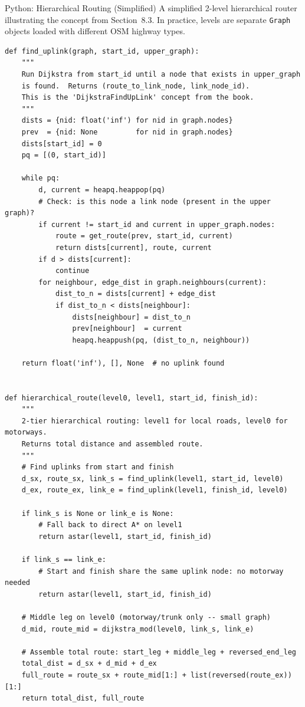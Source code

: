 \documentclass[aspectratio=169,10pt]{beamer}
\begin{document}
\begin{frame}[fragile]{Python: Hierarchical Routing (Simplified)}
  A simplified 2-level hierarchical router illustrating the concept
  from Section~8.3.  In practice, levels are separate \texttt{Graph}
  objects loaded with different OSM highway types.

\begin{lstlisting}[style=pythoncode]
def find_uplink(graph, start_id, upper_graph):
    """
    Run Dijkstra from start_id until a node that exists in upper_graph
    is found.  Returns (route_to_link_node, link_node_id).
    This is the 'DijkstraFindUpLink' concept from the book.
    """
    dists = {nid: float('inf') for nid in graph.nodes}
    prev  = {nid: None         for nid in graph.nodes}
    dists[start_id] = 0
    pq = [(0, start_id)]

    while pq:
        d, current = heapq.heappop(pq)
        # Check: is this node a link node (present in the upper graph)?
        if current != start_id and current in upper_graph.nodes:
            route = get_route(prev, start_id, current)
            return dists[current], route, current
        if d > dists[current]:
            continue
        for neighbour, edge_dist in graph.neighbours(current):
            dist_to_n = dists[current] + edge_dist
            if dist_to_n < dists[neighbour]:
                dists[neighbour] = dist_to_n
                prev[neighbour]  = current
                heapq.heappush(pq, (dist_to_n, neighbour))

    return float('inf'), [], None  # no uplink found


def hierarchical_route(level0, level1, start_id, finish_id):
    """
    2-tier hierarchical routing: level1 for local roads, level0 for motorways.
    Returns total distance and assembled route.
    """
    # Find uplinks from start and finish
    d_sx, route_sx, link_s = find_uplink(level1, start_id, level0)
    d_ex, route_ex, link_e = find_uplink(level1, finish_id, level0)

    if link_s is None or link_e is None:
        # Fall back to direct A* on level1
        return astar(level1, start_id, finish_id)

    if link_s == link_e:
        # Start and finish share the same uplink node: no motorway needed
        return astar(level1, start_id, finish_id)

    # Middle leg on level0 (motorway/trunk only -- small graph)
    d_mid, route_mid = dijkstra_mod(level0, link_s, link_e)

    # Assemble total route: start_leg + middle_leg + reversed_end_leg
    total_dist = d_sx + d_mid + d_ex
    full_route = route_sx + route_mid[1:] + list(reversed(route_ex))[1:]
    return total_dist, full_route
\end{lstlisting}
\end{frame}
\end{document}

